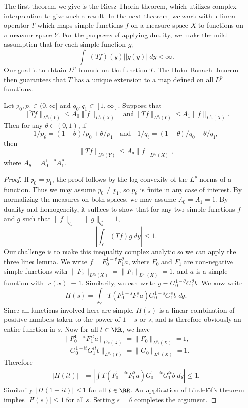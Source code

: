 The first theorem we give is the Riesz-Thorin theorem, which utilizes complex interpolation to give such a result. In the next theorem, we work with a linear operator $T$ which maps simple functions $f$ on a measure space $X$ to functions on a measure space $Y$. For the purposes of applying duality, we make the mild assumption that for each simple function $g$,
%
\[ \int |(Tf)(y)| |g(y)|\; dy < \infty. \]
%
Our goal is to obtain $L^p$ bounds on the function $T$. The Hahn-Banach theorem then guarantees that $T$ has a unique extension to a map defined on all $L^p$ functions.

\begin{theorem}
    Let $p_0,p_1 \in (0,\infty]$ and $q_0,q_1 \in [1,\infty]$. Suppose that
    \[ \| Tf \|_{L^{q_0}(Y)} \leq A_0 \| f \|_{L^{p_0}(X)} \quad \text{and} \| Tf \|_{L^{q_1}(Y)} \leq A_1 \| f \|_{L^{p_1}(X)}.  \]
    Then for any $\theta \in (0,1)$, if
    \[ 1/p_\theta = (1 - \theta)/p_0 + \theta/p_1 \quad\text{and}\quad 1/q_\theta = (1 - \theta)/q_0 + \theta/q_1, \]
    then
    \[ \| Tf \|_{L^{q_\theta}(Y)} \leq A_\theta \| f \|_{L^{p_\theta}(X)}, \]
    where $A_\theta = A_0^{1 - \theta} A_1^\theta$.
\end{theorem}
\begin{proof}
    If $p_0 = p_1$, the proof follows by the log convexity of the $L^p$ norms of a function. Thus we may assume $p_0 \neq p_1$, so $p_\theta$ is finite in any case of interest. By normalizing the measures on both spaces, we may assume $A_0 = A_1 = 1$. By duality and homogeneity, it suffices to show that for any two simple functions $f$ and $g$ such that $\| f \|_{q_\theta} = \| g \|_{q_\theta^*} = 1$,
    \[ \left| \int_Y (Tf) g\; dy \right| \leq 1. \]
    Our challenge is to make this inequality complex analytic so we can apply the three lines lemma. We write $f = F_0^{1 - \theta} F_1^\theta a$, where $F_0$ and $F_1$ are non-negative simple functions with $\| F_0 \|_{L^{p_0}(X)} = \| F_1 \|_{L^{p_1}(X)} = 1$, and $a$ is a simple function with $|a(x)| = 1$. Similarily, we can write $g = G_0^{1-\theta} G_1^\theta b$. We now write
    \[ H(s) = \int_Y T(F_0^{1 - s} F_1^s a) G_0^{1-s} G_1^s b\; dy. \]
    Since all functions involved here are simple, $H(s)$ is a linear combination of positive numbers taken to the power of $1-s$ or $s$, and is therefore obviously an entire function in $s$. Now for all $t \in \RR$, we have
    \[ \| F_0^{1-it} F_1^{it} a \|_{L^{p_0}(X)} = \| F_0 \|_{L^{p_0}(X)} = 1, \]
    \[ \| G_0^{1-it} G_1^{it} b \|_{L^{q_0}(Y)} = \| G_0 \|_{L^{q_0}(X)} = 1. \]
    Therefore
    \begin{align*}
      |H(it)| &= \left| \int T(F_0^{1 - it} F_1^{it} a) G_0^{1-it} G_1^{it} b\; dy \right| \leq 1.
    \end{align*}
    Similarily, $|H(1 + it)| \leq 1$ for all $t \in \RR$. An application of Lindel\"{o}f's theorem implies $|H(s)| \leq 1$ for all $s$. Setting $s = \theta$ completes the argument.
\end{proof}

